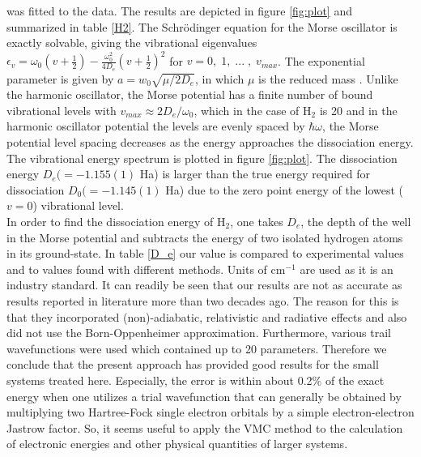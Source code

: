 \documentclass{article}
\begin{document}
was fitted to the data. The results are depicted in figure \ref{fig:plot} and summarized in table \ref{H2}. The Schr\"odinger equation for the Morse oscillator is exactly solvable, giving the vibrational eigenvalues $\epsilon_v=\omega_0 (v+\frac12)-\frac{\omega_0^2}{4D_e}(v+\frac12)^2$ for $v=0,\;1,\;...\;,\;v_{max}$. The exponential parameter is given by $a=w_0\sqrt{\mu/2D_e}$, in which $\mu$ is the reduced mass \citep{morse1929diatomic}. Unlike the harmonic oscillator, the Morse potential has a finite number of bound vibrational levels with $v_{max} \approx 2D_e/\omega_0$, which in the case of H$_2$ is 20 and in the harmonic oscillator potential the levels are evenly spaced by $\hbar \omega$, the Morse potential level spacing decreases as the energy approaches the dissociation energy. The vibrational energy spectrum is plotted in figure \ref{fig:plot}. The dissociation energy $D_e(=-1.155(1)$ Ha) is larger than the true energy required for dissociation $D_0(=-1.145(1)$ Ha) due to the zero point energy of the lowest ($v = 0$) vibrational level.\\


In order to find the dissociation energy of H$_2$, one takes $D_e$, the depth of the well in the Morse potential and subtracts the energy of two isolated hydrogen atoms in its ground-state. In table \ref{D_e} our value is compared to experimental values and to values found with different methods. Units of cm$^{-1}$ are used as it is an industry standard. It can readily be seen that our results are not as accurate as results reported in literature \citep{traynor1991quantum, szalewicz1986new, wolniewicz1983x} more than two decades ago. The reason for this is that they incorporated (non)-adiabatic, relativistic and radiative effects and also did not use the Born-Oppenheimer approximation. Furthermore, various trail wavefunctions were used which contained up to 20 parameters. Therefore we conclude that the present approach has provided good results for the small systems treated here. Especially, the error is within about 0.2\% of the exact energy when one utilizes a trial wavefunction that can generally be obtained by multiplying two Hartree-Fock single electron orbitals by a simple electron-electron Jastrow factor. So, it seems useful to apply the VMC method to the calculation of electronic energies and other physical quantities of larger systems.
\end{document}
